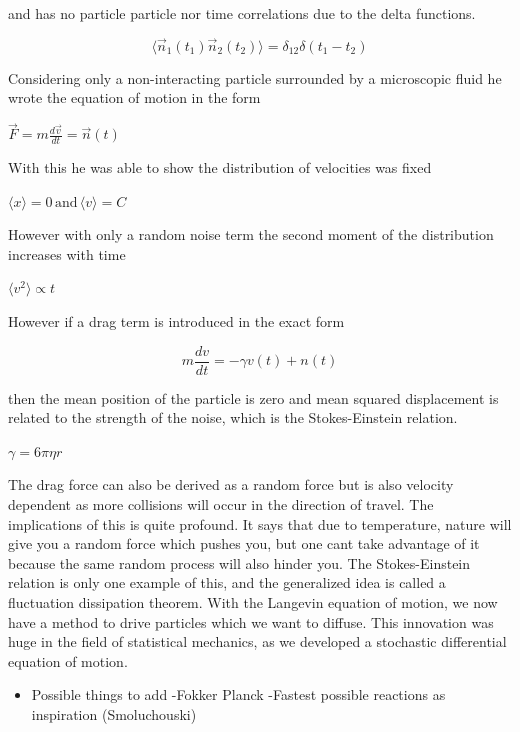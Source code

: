 \documentclass{article}
\begin{document}
and has no particle particle nor time correlations due to the delta functions.

\begin{equation}
\langle \vec{n}_1(t_1) \vec{n}_2(t_2) \rangle = \delta_{12} \delta(t_1 - t_2)
\end{equation}

Considering only a non-interacting particle surrounded by a microscopic fluid he wrote the equation of motion in the form

$\vec{F} = m \frac{d\vec{v}}{dt} = \vec{n}(t)$

With this he was able to show the distribution of velocities was fixed

$\langle x \rangle = 0 \, \text{and} \, \langle v \rangle = C$

However with only a random noise term the second moment of the distribution increases with time

$\langle v^2 \rangle \propto t$

However if a drag term is introduced in the exact form

\begin{equation}
m\frac{dv}{dt} = -\gamma v(t) + n(t)
\end{equation}

then the mean position of the particle is zero and mean squared displacement is related to the strength of the noise, which is the Stokes-Einstein relation.

$\gamma = 6\pi\eta r$

The drag force can also be derived as a random force but is also velocity dependent as more collisions will occur in the direction of travel. The implications of this is quite profound. It says that due to temperature, nature will give you a random force which pushes you, but one cant take advantage of it because the same random process will also hinder you. The Stokes-Einstein relation is only one example of this, and the generalized idea is called a fluctuation dissipation theorem. With the Langevin equation of motion, we now have a method to drive particles which we want to diffuse. This innovation was huge in the field of statistical mechanics, as we developed a stochastic differential equation of motion.

\begin{itemize}
\item Possible things to add \newline
-Fokker Planck \newline
-Fastest possible reactions as inspiration (Smoluchouski)
\end{itemize}
\end{document}
